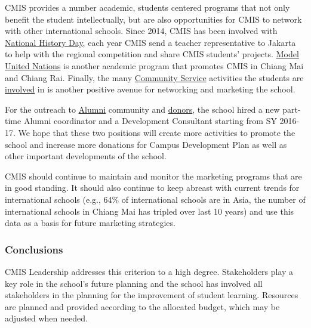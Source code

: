 \begin{findings}
CMIS provides a number academic, students centered programs that not only benefit the student intellectually, but are also opportunities for CMIS to network with other international schools. Since 2014, CMIS has been involved with \href{http://blogs.cmis.ac.th/newsletter/2016/03/21/cmis-student-take-top-awards-in-the-south-asia-division-of-the-national-history-day-competition/}{National History Day}, each year CMIS send a teacher representative to Jakarta to help with the regional competition and share CMIS students’ projects. \href{http://gallery.cmis.ac.th/2016-2017/MUN/}{Model United Nations} is another academic program that promotes CMIS in Chiang Mai and Chiang Rai. Finally, the many \href{http://blogs.cmis.ac.th/community-service/}{Community Service} activities the students are \href{http://blogs.cmis.ac.th/newsletter/2016/11/10/cmis-community-service-at-northern-school-for-the-blind/}{involved} in is another positive avenue for networking and marketing the school. 

For the outreach to \href{https://www.facebook.com/cmis.alumni/}{Alumni} community and \href{http://cmis.ac.th/support}{donors}, the school hired a new part-time Alumni coordinator and a Development Consultant starting from SY 2016-17. We hope that these two positions will create more activities to promote the school and increase more donations for Campus Development Plan as well as other important developments of the school.


CMIS should continue to maintain and monitor the marketing programs that are in good standing. It should also continue to keep abreast with current trends for international schools (e.g., 64\% of international schools are in Asia, the number of international schools in Chiang Mai has tripled over last 10 years) and use this data as a basis for future marketing strategies. 
\end{findings}

\subsubsection{Conclusions}
CMIS Leadership addresses this criterion to a high degree. Stakeholders play a key role in the school’s future planning and the school has involved all stakeholders in the planning for the improvement of student learning. Resources are planned and provided according to the allocated budget, which may be adjusted when needed.

